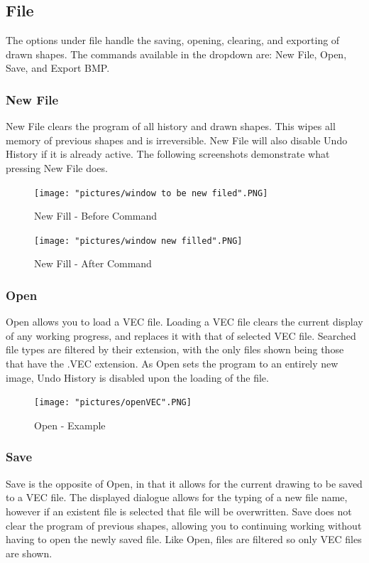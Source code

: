 \documentclass[12pt]{article} %
\begin{document}
\subsection{File}
The options under file handle the saving, opening, clearing, and exporting of drawn shapes. The commands available in the dropdown are: New File, Open, Save, and Export BMP.

\subsubsection{New File}
New File clears the program of all history and drawn shapes. This wipes all memory of previous shapes and is irreversible. New File will also disable Undo History if it is already active. The following screenshots demonstrate what pressing New File does.

\begin{figure}[hbtp]
\caption{New Fill - Before Command}
\centering
\texttt{[image: "pictures/window to be new filed".PNG]}
\end{figure}

\begin{figure}[hbtp]
\caption{New Fill - After Command}
\centering
\texttt{[image: "pictures/window new filled".PNG]}
\end{figure}

\subsubsection{Open}
Open allows you to load a VEC file. Loading a VEC file clears the current display of any working progress, and replaces it with that of selected VEC file. Searched file types are filtered by their extension, with the only files shown being those that have the .VEC extension. As Open sets the program to an entirely new image, Undo History is disabled upon the loading of the file.

\begin{figure}[hbtp]
\caption{Open - Example}
\centering
\texttt{[image: "pictures/openVEC".PNG]}
\end{figure}

\subsubsection{Save}
Save is the opposite of Open, in that it allows for the current drawing to be saved to a VEC file. The displayed dialogue allows for the typing of a new file name, however if an existent file is selected that file will be overwritten. Save does not clear the program of previous shapes, allowing you to continuing working without having to open the newly saved file. Like Open, files are filtered so only VEC files are shown. 
\end{document}
